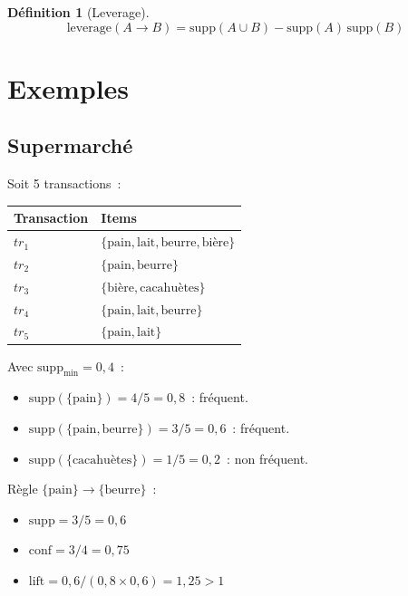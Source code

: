 \documentclass[a4paper,11pt]{article}
\theoremstyle{definition}
\newtheorem*{definition}{D\'efinition}
\theoremstyle{remark}
\begin{document}
\begin{definition}[Leverage]
  \begin{equation}
    \text{leverage}(A \rightarrow B) = \text{supp}(A \cup B) -
    \text{supp}(A)\,\text{supp}(B)
  \end{equation}
\end{definition}

\section{Exemples}

\subsection{Supermarch\'e}

Soit 5 transactions~:

\begin{center}
\begin{tabular}{ll}
\toprule
Transaction & Items \\
\midrule
$tr_1$ & $\{ \text{pain}, \text{lait}, \text{beurre}, \text{bi\`ere} \}$ \\
$tr_2$ & $\{ \text{pain}, \text{beurre} \}$ \\
$tr_3$ & $\{ \text{bi\`ere}, \text{cacahu\`etes} \}$ \\
$tr_4$ & $\{ \text{pain}, \text{lait}, \text{beurre} \}$ \\
$tr_5$ & $\{ \text{pain}, \text{lait} \}$ \\
\bottomrule
\end{tabular}
\end{center}

\noindent Avec $\text{supp}_{\min} = 0{,}4$~:
\begin{itemize}
  \item $\text{supp}(\{\text{pain}\}) = 4/5 = 0{,}8$~: fr\'equent.
  \item $\text{supp}(\{\text{pain}, \text{beurre}\}) = 3/5 = 0{,}6$~: fr\'equent.
  \item $\text{supp}(\{\text{cacahu\`etes}\}) = 1/5 = 0{,}2$~: non fr\'equent.
\end{itemize}

R\`egle $\{\text{pain}\} \rightarrow \{\text{beurre}\}$~:
\begin{itemize}
  \item $\text{supp} = 3/5 = 0{,}6$
  \item $\text{conf} = 3/4 = 0{,}75$
  \item $\text{lift} = 0{,}6 / (0{,}8 \times 0{,}6) = 1{,}25 > 1$
\end{itemize}
\end{document}
